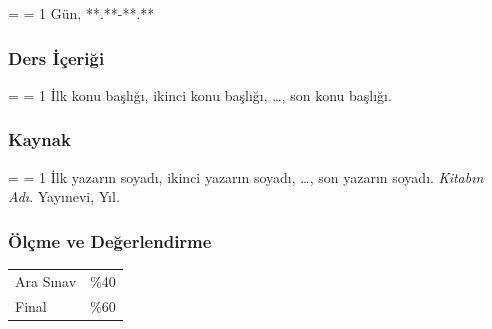 \documentclass{article}
\begin{document}
\hangindent = \parindent
\hangafter = 1
%
Gün, **.**-**.**

\subsubsection*{Ders İçeriği}

\hangindent = \parindent
\hangafter = 1
%
İlk konu başlığı, ikinci konu başlığı, \ldots, son konu başlığı.

\subsubsection*{Kaynak}

\hangindent = \parindent
\hangafter = 1
%
İlk yazarın soyadı, ikinci yazarın soyadı, \ldots, son yazarın soyadı. \emph{Kitabın Adı}. Yayınevi, Yıl.

\subsubsection*{Ölçme ve Değerlendirme}

\begin{tabular}{@{}ll@{}} %
Ara Sınav & \%40 \\
Final & \%60 \\
\end{tabular}

%
%
%
%
\end{document}
